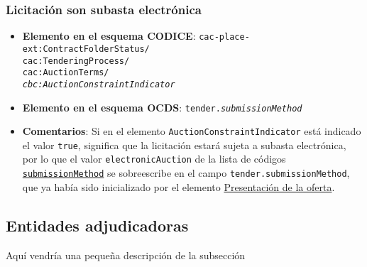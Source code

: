         \subsubsection{Licitación son subasta electrónica}
            \begin{itemize}
                \item \textbf{Elemento en el esquema CODICE}:
                    \tabto{7.6cm} \texttt{cac-place-ext:ContractFolderStatus/} \\
                    \tabto{7.6cm} \texttt{cac:TenderingProcess/} \\
                    \tabto{7.6cm} \texttt{cac:AuctionTerms/} \\
                    \tabto{7.6cm} \texttt{\textit{cbc:AuctionConstraintIndicator}}
                \item \textbf{Elemento en el esquema OCDS}:
                    \tabto{7.6cm} \texttt{tender.\textit{submissionMethod}}
                \item \textbf{Comentarios}: Si en el elemento \texttt{AuctionConstraintIndicator} está indicado el valor \texttt{true}, significa que la licitación estará sujeta a subasta electrónica, por lo que el valor \texttt{electronicAuction} de la lista de códigos \href{https://standard.open-contracting.org/latest/es/schema/codelists/#submission-method}{\texttt{submissionMethod}} se sobreescribe en el campo \texttt{tender.submissionMethod}, que ya había sido inicializado por el elemento \hyperref[subsec:PresentacionOferta]{Presentación de la oferta}.
            \end{itemize}
        
    \vspace{0.3cm}
    
    \subsection{Entidades adjudicadoras}
    
        Aquí vendría una pequeña descripción de la subsección
    
